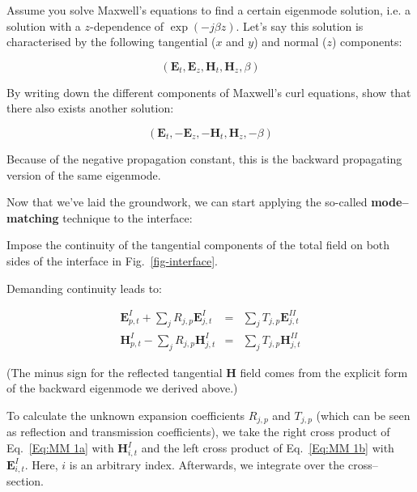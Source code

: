 \begin{exer}
Assume you solve Maxwell's equations to find a certain eigenmode solution, i.e. a solution with a $z$-dependence of $\exp{(-j \beta z)}$. Let's say this solution is characterised by the following tangential ($x$ and $y$) and normal ($z$) components:

$$\left( \mathbf{E}_{t},\mathbf{E}_{z},\mathbf{H}_{t},\mathbf{H}_{z},\beta \right)$$

By writing down the different components of Maxwell's curl equations, show that there also exists another solution:

$$  \left( \mathbf{E}_{t},-\mathbf{E}_{z},-\mathbf{H}_{t},\mathbf{H}_{z},-\beta \right) $$

Because of the negative propagation constant, this is the backward propagating version of the same eigenmode.

\end{exer}

\pagebreak


Now that we've laid the groundwork, we can start applying the so-called \textbf{mode--matching} technique to the interface:

\begin{cue}
Impose the continuity of the tangential components of the total field on both sides of the interface in Fig.~\ref{fig-interface}.  
\end{cue}

Demanding continuity leads to:  

\begin{eqnarray}
\mathbf{E}^{I}_{p,t}+\sum _{j}R_{j,p}\mathbf{E}^{I}_{j,t} & = & \sum _{j}T_{j,p}\mathbf{E}^{II}_{j,t}\label{Eq:MM 1a} \\
\mathbf{H}^{I}_{p,t}-\sum _{j}R_{j,p}\mathbf{H}^{I}_{j,t} & = & \sum _{j}T_{j,p}\mathbf{H}^{II}_{j,t}\label{Eq:MM 1b} 
\end{eqnarray}

(The minus sign for the reflected tangential ${\mathbf H}$ field comes from the explicit form of the backward eigenmode we derived above.)

To calculate the unknown expansion coefficients $R_{j,p}$ and $T_{j,p}$ (which can be seen as reflection and transmission coefficients), we take the right cross product of Eq.~\ref{Eq:MM 1a} with $\mathbf{H}^{I}_{i,t}$ and the left cross product of Eq.~\ref{Eq:MM 1b} with $\mathbf{E}^{I}_{i,t}$. Here, $i$ is an arbitrary index. Afterwards, we integrate over the cross--section.

